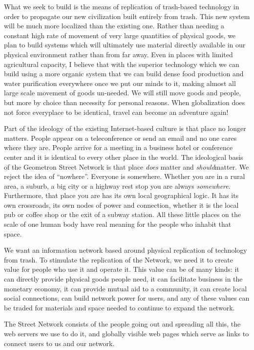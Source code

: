 \documentclass{report}
\begin{document}
What we seek to build is the means of replication of trash-based
technology in order to propagate our new civilization built entirely
from trash. This new system will be much more localized than the
existing one. Rather than needing a constant high rate of movement of
very large quantities of physical goods, we plan to build systems which
will ultimately use material directly available in our physical
environment rather than from far away. Even in places with limited
agricultural capacity, I believe that with the superior technology which
we can build using a more organic system that we can build dense food
production and water purification everywhere once we put our minds to
it, making almost all large scale movement of goods un-needed. We will
still move goods and people, but more by choice than necessity for
personal reasons. When globalization does not force everyplace to be
identical, travel can become an adventure again!

Part of the ideology of the existing Internet-based culture is that
place no longer matters. People appear on a teleconference or send an
email and no one cares where they are. People arrive for a meeting in a
business hotel or conference center and it is identical to every other
place in the world. The ideological basis of the Geometron Street
Network is that place \emph{does} matter and \emph{should}matter. We
reject the idea of ``nowhere''. Everyone is somewhere. Whether you are
in a rural area, a suburb, a big city or a highway rest stop you are
always \emph{somewhere}. Furthermore, that place you are has its own
local geographical logic. It has its own crossroads, its own nodes of
power and connection, whether it is the local pub or coffee shop or the
exit of a subway station. All these little places on the scale of one
human body have real meaning for the people who inhabit that space.

We want an information network based around physical replication of
technology from trash. To stimulate the replication of the Network, we
need it to create value for people who use it and operate it. This value
can be of many kinds: it can directly provide physical goods people
need, it can facilitate business in the monetary economy, it can provide
mutual aid to a community, it can create local social connections, can
build network power for users, and any of these values can be traded for
materials and space needed to continue to expand the network.

The Street Network consists of the people going out and spreading all
this, the web servers we use to do it, and globally visible web pages
which serve as links to connect users to us and our network.
\end{document}
